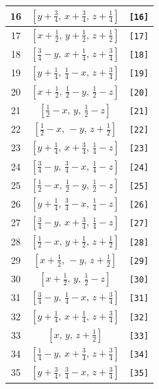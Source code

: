 \documentclass[fleqn,8pt]{jsarticle}
\begin{document}
\begin{longtable}{ccc}
16 & $\left[ y + \frac{3}{4},\, x + \frac{3}{4},\, z + \frac{1}{4} \right]$ & {\tt [16]} \\ \hline
17 & $\left[ x + \frac{1}{2},\, y + \frac{1}{2},\, z + \frac{1}{2} \right]$ & {\tt [17]} \\ \hline
18 & $\left[ \frac{3}{4} - y,\, x + \frac{1}{4},\, z + \frac{3}{4} \right]$ & {\tt [18]} \\ \hline
19 & $\left[ y + \frac{1}{4},\, \frac{1}{4} - x,\, z + \frac{3}{4} \right]$ & {\tt [19]} \\ \hline
20 & $\left[ x + \frac{1}{2},\, \frac{1}{2} - y,\, \frac{1}{2} - z \right]$ & {\tt [20]} \\ \hline
21 & $\left[ \frac{1}{2} - x,\, y,\, \frac{1}{2} - z \right]$ & {\tt [21]} \\ \hline
22 & $\left[ \frac{1}{2} - x,\, - y,\, z + \frac{1}{2} \right]$ & {\tt [22]} \\ \hline
23 & $\left[ y + \frac{1}{4},\, x + \frac{3}{4},\, \frac{1}{4} - z \right]$ & {\tt [23]} \\ \hline
24 & $\left[ \frac{3}{4} - y,\, \frac{3}{4} - x,\, \frac{1}{4} - z \right]$ & {\tt [24]} \\ \hline
25 & $\left[ \frac{1}{2} - x,\, \frac{1}{2} - y,\, \frac{1}{2} - z \right]$ & {\tt [25]} \\ \hline
26 & $\left[ y + \frac{1}{4},\, \frac{3}{4} - x,\, \frac{1}{4} - z \right]$ & {\tt [26]} \\ \hline
27 & $\left[ \frac{3}{4} - y,\, x + \frac{3}{4},\, \frac{1}{4} - z \right]$ & {\tt [27]} \\ \hline
28 & $\left[ \frac{1}{2} - x,\, y + \frac{1}{2},\, z + \frac{1}{2} \right]$ & {\tt [28]} \\ \hline
29 & $\left[ x + \frac{1}{2},\, - y,\, z + \frac{1}{2} \right]$ & {\tt [29]} \\ \hline
30 & $\left[ x + \frac{1}{2},\, y,\, \frac{1}{2} - z \right]$ & {\tt [30]} \\ \hline
31 & $\left[ \frac{3}{4} - y,\, \frac{1}{4} - x,\, z + \frac{3}{4} \right]$ & {\tt [31]} \\ \hline
32 & $\left[ y + \frac{1}{4},\, x + \frac{1}{4},\, z + \frac{3}{4} \right]$ & {\tt [32]} \\ \hline
33 & $\left[ x,\, y,\, z + \frac{1}{2} \right]$ & {\tt [33]} \\ \hline
34 & $\left[ \frac{1}{4} - y,\, x + \frac{3}{4},\, z + \frac{3}{4} \right]$ & {\tt [34]} \\ \hline
35 & $\left[ y + \frac{3}{4},\, \frac{3}{4} - x,\, z + \frac{3}{4} \right]$ & {\tt [35]} \\ \hline

\end{longtable}
\end{document}
